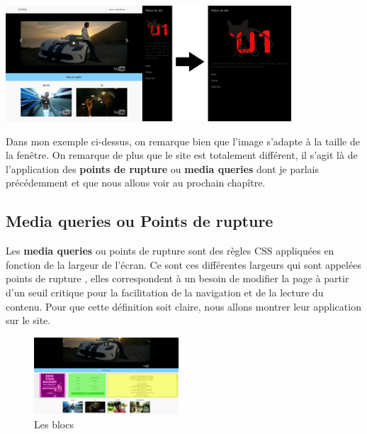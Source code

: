 \documentclass{article}
\begin{document}
\begin{center}
  \includegraphics[width=0.8\textwidth]{p4}
\end{center}

Dans mon exemple ci-dessus, on remarque bien que l'image s'adapte \`a la taille de la fen\^etre. On remarque de plus que le site est totalement diff\'erent, il s'agit l\`a de l'application des \textbf{points de rupture} ou \textbf{media queries} dont je parlais pr\'ec\'edemment et que nous allons voir au prochain chap\^itre.

\subsection{Media queries ou Points de rupture}

Les \textbf{media queries} ou points de rupture sont des r\`egles CSS appliqu\'ees en fonction de la largeur de l'\'ecran. Ce sont ces diff\'erentes largeurs qui sont appel\'ees \og points de rupture \fg{}, elles correspondent \`a un besoin de modifier la page \`a partir d'un seuil critique pour la facilitation de la navigation et de la lecture du contenu. Pour que cette d\'efinition soit claire, nous allons montrer leur application sur le site. \\

\begin{figure}
  \vspace{-20pt}
  \begin{center}
    \includegraphics[width=0.48\textwidth]{p5}
  \end{center}
  \vspace{-20pt}
  \caption{Les blocs}
  \vspace{-10pt}
\end{figure} 
\end{document}
